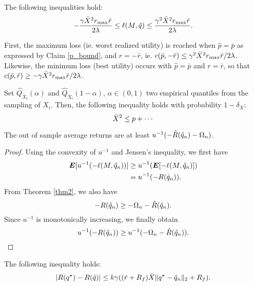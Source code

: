 \begin{claim}
  \label{ell_bound}
  The following inequalities hold:
  \[
    -\frac{\gamma\bar X^2r_{\max}\bar r}{2\lambda} \leq \ell(M,\hat q) \leq \frac{\gamma^2
      \bar X^2 r_{\max} \bar r}{2\lambda}.
  \]
\end{claim}
First, the maximum loss (ie. worst realized utility) is reached when $\hat p=\bar p$ as
expressed by Claim \ref{p_bound}, and $r=-\bar r$, ie.
$c(\bar p,-\bar r) \leq \gamma^2\bar X^2 r_{\max}\bar r/2\lambda$. Likewise, the minimum
loss (best utility) occurs with $\hat p  = \bar p$ and $r = \bar r$, so that $c(\bar p,
\bar r) \geq -\gamma\bar X^2r_{\max}\bar r/2\lambda$. 

\begin{claim}
  Set $\hat Q_{X_i}(\alpha)$ and $\hat Q_{X_i}(1-\alpha)$, $\alpha\in(0,1)$ two empirical
  quantiles from the sampling of $X_i$. Then, the following inequality holds with
  probability $1-\delta_X$:
  \[
    \bar X^2 \leq p + \cdots
  \]
\end{claim}

\begin{claim}
  \label{out_of_sample_claim}
  The out of sample average returns are at least $u^{-1}(-\hat R({\hat q}_n) - \Omega_n)$.
\end{claim}
\begin{proof}
  Using the convexity of $u^{-1}$ and Jensen's inequality, we first have
  \begin{align*}
    \bm E[u^{-1}(-\ell(M,{\hat q}_n))] &\geq u^{-1}(\bm E[-\ell(M,{\hat q}_n)])\\
                                &=u^{-1}(-R({\hat q}_n)).
  \end{align*}
  From Theorem \ref{thm2}, we also have 
  \[
    -R({\hat q}_n) \geq -\Omega_n - \hat R({\hat q}_n).
  \]
  Since $u^{-1}$ is monotonically increasing, we finally obtain
  \[
    u^{-1}(-R({\hat q}_n)) \geq u^{-1}(-\Omega_n - \hat R({\hat q}_n)).\qedhere
  \]
\end{proof}


\begin{claim}
\label{claim1}
 The following inequality holds:
\[
  |R({q^\star}) - R(\hat q)| \leq k\gamma((\bar r +R_f)\bar X\|{q^\star} - {\hat q}_n\|_2 + R_f).
\]
\end{claim}

